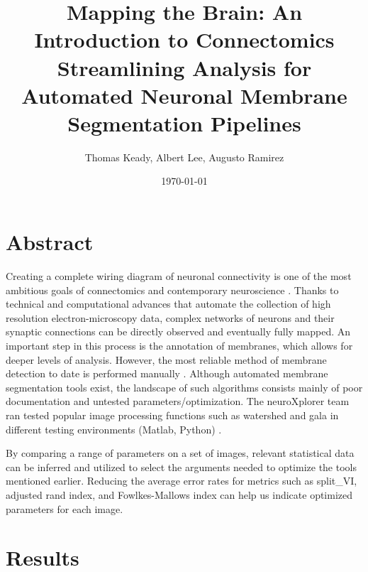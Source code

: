 \documentclass[11pt]{article}
\title{Mapping the Brain: An Introduction to Connectomics\\Streamlining Analysis for Automated Neuronal Membrane Segmentation Pipelines}
\author{Thomas Keady, Albert Lee, Augusto Ramirez}
\date{\today}
\begin{document}
\maketitle

\section{Abstract}

Creating a complete wiring diagram of neuronal connectivity is one of the most ambitious goals of connectomics and contemporary neuroscience \cite{roncal1}. Thanks to technical and computational advances that automate the collection of high resolution electron-microscopy data, complex networks of neurons and their synaptic connections can be directly observed and eventually fully mapped. An important step in this process is the annotation of membranes, which allows for deeper levels of analysis. However, the most reliable method of membrane detection to date is performed manually \cite{plaza}. Although automated membrane segmentation tools exist, the landscape of such algorithms consists mainly of poor documentation and untested parameters/optimization. The neuroXplorer team ran tested popular image processing functions such as watershed and gala in different testing environments (Matlab, Python) \cite{nguyen}.

By comparing a range of parameters on a set of images, relevant statistical data can be inferred and utilized to select the arguments needed to optimize the tools mentioned earlier. Reducing the average error rates for metrics such as split\_VI, adjusted rand index, and Fowlkes-Mallows index can help us indicate optimized parameters for each image.

\section{Results}
\end{document}
